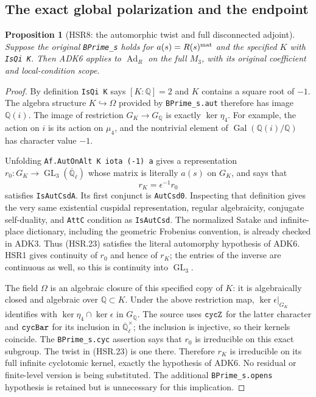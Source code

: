 \documentclass[11pt,a4paper]{article}
\numberwithin{equation}{section}
\newtheorem{proposition}[theorem]{Proposition}
\theoremstyle{remark}\newtheorem{remark}[theorem]{Remark}
\begin{document}
\subsection{The exact global polarization and the endpoint}

\begin{proposition}[HSR8: the automorphic twist and full disconnected adjoint]
\label{claim:HSR8}
Suppose the original \texttt{BPrime\_\allowbreak s} holds for
$a(s)=R(s)^{\rm mat}$ and the specified $K$ with
\texttt{Is\allowbreak Qi K}.  Then ADK6 applies to
$\operatorname{Ad}_R$ on the full $M_3$, with its original
coefficient and local-condition scope.
\end{proposition}
\begin{proof}
By definition \texttt{Is\allowbreak Qi K} says $[K:\mathbb Q]=2$ and
$K$ contains a square root of $-1$.  The algebra structure
$K\hookrightarrow\Omega$ provided by
\texttt{BPrime\_\allowbreak s.\allowbreak aut} therefore has image $\mathbb Q(i)$.
The image of restriction $G_K\to G_{\mathbb Q}$ is exactly
$\ker\eta_4$.  For example, the action on $i$ is its action on
$\mu_4$, and the nontrivial element of
$\operatorname{Gal}(\mathbb Q(i)/\mathbb Q)$ has character
value $-1$.

Unfolding \texttt{Af.\allowbreak Aut\allowbreak On\allowbreak Alt K iota (-1) a} gives a
representation $r_0:G_K\to\operatorname{GL}_3
(\overline{\mathbb Q}_\ell)$ whose matrix is literally
$a(s)$ on $G_K$, and says that
\[
                         r_K=\epsilon^{-1}r_0
 \tag{HSR.23}
\]
satisfies \texttt{Is\allowbreak Aut\allowbreak Csd\allowbreak A}.  Its first conjunct is
\texttt{Aut\allowbreak Csd0}.  Inspecting that definition gives the very same
existential cuspidal representation, regular algebraicity,
conjugate self-duality, and \texttt{Att\allowbreak C} condition as
\texttt{Is\allowbreak Aut\allowbreak Csd}.  The normalized Satake and infinite-place
dictionary, including the geometric Frobenius convention, is
already checked in ADK3.  Thus (HSR.23) satisfies the literal
automorphy hypothesis of ADK6.  HSR1 gives continuity of $r_0$
and hence of $r_K$; the entries of the inverse are continuous as
well, so this is continuity into $\operatorname{GL}_3$.

The field $\Omega$ is an algebraic closure of this specified
copy of $K$: it is algebraically closed and algebraic over
$\mathbb Q\subset K$.  Under the above restriction map,
$\ker\epsilon|_{G_K}$ identifies with
$\ker\eta_4\cap\ker\epsilon$ in $G_{\mathbb Q}$.
The source uses $\texttt{cyc\allowbreak Z}$ for the latter character and
$\texttt{cyc\allowbreak Bar}$ for its inclusion in
$\overline{\mathbb Q}_\ell^\times$; the inclusion is injective,
so their kernels coincide.  The \texttt{BPrime\_\allowbreak s.\allowbreak cyc}
assertion says that $r_0$ is irreducible on this exact subgroup.
The twist in (HSR.23) is one there.  Therefore $r_K$ is
irreducible on its full infinite cyclotomic kernel, exactly the
hypothesis of ADK6.  No residual or finite-level version is being
substituted.  The additional \texttt{BPrime\_\allowbreak s.\allowbreak opens} hypothesis
is retained but is unnecessary for this implication.


\end{proof}
\end{document}
